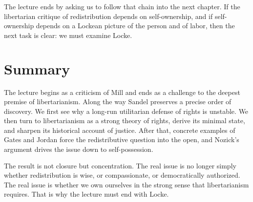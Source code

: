 The lecture ends by asking us to follow that chain into the next chapter. If the libertarian critique of redistribution depends on self-ownership, and if self-ownership depends on a Lockean picture of the person and of labor, then the next task is clear: we must examine Locke.

\section{Summary}

The lecture begins as a criticism of Mill and ends as a challenge to the deepest premise of libertarianism. Along the way Sandel preserves a precise order of discovery. We first see why a long-run utilitarian defense of rights is unstable. We then turn to libertarianism as a strong theory of rights, derive its minimal state, and sharpen its historical account of justice. After that, concrete examples of Gates and Jordan force the redistributive question into the open, and Nozick's argument drives the issue down to self-possession.

The result is not closure but concentration. The real issue is no longer simply whether redistribution is wise, or compassionate, or democratically authorized. The real issue is whether we own ourselves in the strong sense that libertarianism requires. That is why the lecture must end with Locke.